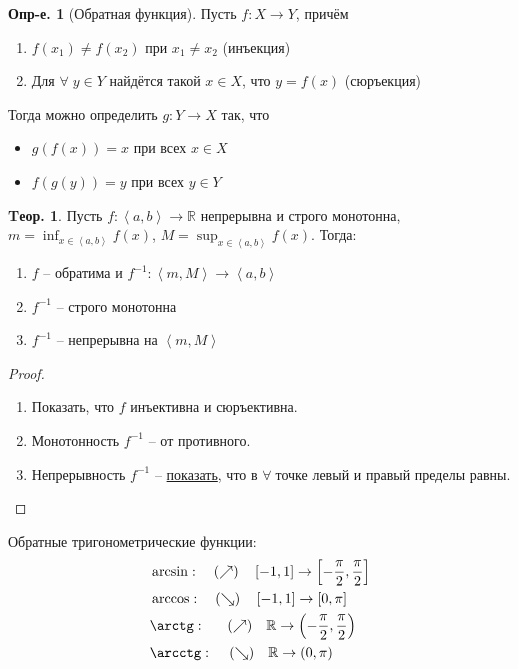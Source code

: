 \documentclass[a4paper,12pt]{article}
\numberwithin{figure}{section}
\theoremstyle{definition}
\newtheorem{definition}{Опр-е.}[section]
\theoremstyle{definition}
\newtheorem{theorem}{Tеор.}[section]
\def\DS{\displaystyle}
\def\RR{\mathbb{R}}
\def\on{\!:}
\def\intab{\left<a,b\right>}
\def\any{$\forall\;$}
\begin{document}
\begin{definition}[Обратная функция]
	Пусть $f\on X\to Y$, причём\begin{enumerate}
		\item $f(x_1)\ne f(x_2)$ при $x_1\ne x_2$ (инъекция)
		\item Для \any $y\in Y$ найдётся такой $x\in X$, что $y=f(x)$ (сюръекция)
	\end{enumerate}
	Тогда можно определить $g\on Y\to X$ так, что\begin{itemize}
		\item $g(f(x))=x$ при всех $x\in X$
		\item $f(g(y))=y$ при всех $y\in Y$
	\end{itemize}
\end{definition}

\begin{theorem}
	Пусть $f\on \intab\to\RR$ непрерывна и строго монотонна,
	$\DS m=\inf_{x \in \intab}f(x)$,
	$\DS M=\sup_{x \in \intab}f(x)$.
	Тогда:
	\begin{enumerate}
		\item $f$ -- обратима и $f^{-1}\on \left<m,M\right> \to \intab$
		\item $f^{-1}$ -- строго монотонна
		\item $f^{-1}$ -- непрерывна на $\left<m,M\right>$
	\end{enumerate}
\end{theorem}
\begin{proof}
  \begin{enumerate}
	\item Показать, что $f$ инъективна и сюръективна.
	\item Монотонность $f^{-1}$ -- от противного.
	\item Непрерывность $f^{-1}$ -- \href{https://stepik.org/lesson/9530/step/6}{показать},
		  что в \any точке левый и правый пределы равны.
  \end{enumerate}
\end{proof}
\bigskip

Обратные тригонометрические функции:
\begin{align*}
	  & \arcsin:     \quad (\nearrow) \quad \left[ -1, 1 \right] \to \left[ -\frac\pi2, \frac\pi2 \right]
	\\& \arccos:     \quad (\searrow) \quad \left[ -1, 1 \right] \to \left[ 0, \pi \right]
	\\& \arctg: \;\; \quad (\nearrow) \quad \RR \to \left( -\frac\pi2, \frac\pi2 \right)
	\\& \arcctg:  \, \quad (\searrow) \quad \RR \to \left( 0, \pi \right)
\end{align*}
\end{document}
